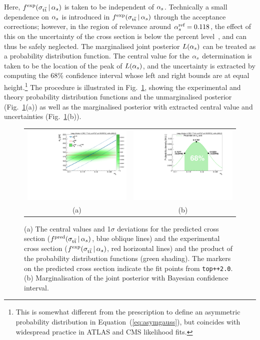 %
Here, $f^{\text{exp}}(\sigma_{\mathrm{t}\overline{\mathrm{t}}}\,|\,\alpha_s)$ is taken to be independent of
$\alpha_s$. Technically a small dependence on $\alpha_s$ is introduced in
$f^{\text{exp}}(\sigma_{\mathrm{t}\overline{\mathrm{t}}}\,|\,\alpha_s)$ through the acceptance corrections;
however, in the region of relevance around $\alpha_s^{\text{ref}} = 0.118$,
the effect of this on the uncertainty of the cross section is below
the percent level~\cite{Chatrchyan:2013haa}, and can thus be safely
neglected.  
%
The marginalised joint posterior $L(\alpha_s)$ can be treated
as a probability distribution function. 
%
The central value for the $\alpha_s$ determination is taken to be the
location of the peak of $L(\alpha_s)$, and the
%
uncertainty is extracted by computing the 68\% confidence interval
whose left and right bounds are at equal height.\footnote{This is
  somewhat different from the prescription to define an asymmetric
  probability distribution in Equation~(\ref{eq:asymgauss}), but coincides
  with widespread practice in ATLAS and CMS likelihood fits.}
%
The procedure is illustrated in Fig.~\ref{fig:fullproc}, showing the
experimental and theory probability distribution functions and the
unmarginalised posterior (Fig.~\ref{fig:fullproc}(a)) as well as the
marginalised posterior with extracted central value and uncertainties
(Fig.~\ref{fig:fullproc}(b)).


\begin{figure}[htb]
\centering
\begin{tabular}{cc}
\includegraphics[width=0.5\linewidth]{img/alphas/fullproc.pdf}
&
\includegraphics[width=0.5\linewidth]{img/alphas/alphasDistribution.pdf}
\\
(a) & (b)
\end{tabular}
\vspace{-0.3cm}
\caption{
  (a) The central values and 1$\sigma$ deviations for the predicted cross
  section ($f^{\text{pred}}(\sigma_{\mathrm{t}\overline{\mathrm{t}}}\,|\,\alpha_s)$, blue oblique lines) and
  the experimental cross section ($f^{\text{exp}}(\sigma_{\mathrm{t}\overline{\mathrm{t}}}\,|\,\alpha_s)$,
  red horizontal lines) 
  and the product of the probability distribution functions (green
  shading).
  The markers on the predicted cross
  section indicate the fit points from \texttt{top++2.0}. (b)
  Marginalisation of the joint posterior with Bayesian confidence
  interval.
  }
\label{fig:fullproc}
\end{figure}


